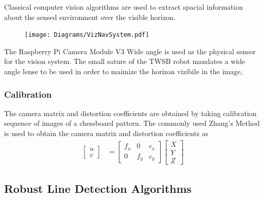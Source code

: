        Classical computer vision algorithms are used to extract spacial information about the sensed environment over the visible 
        horizon.


        

        

        \begin{figure}[H]
            \centering
            \texttt{[image: Diagrams/VizNavSystem.pdf]}
        \end{figure}

        

        The Raspberry Pi Camera Module V3 Wide angle is used as the physical sensor for the vision system.
        The small sature of the TWSB robot mandates a wide angle lense to be used in order to maimize 
        the horizon vizibile in the image, 
        \subsubsection{Calibration}
        The camera matrix and distortion coefficients are obtained by taking calibration sequence of images of a 
        chessboard pattern. The commonly used Zhang's Method is used to obtain the camera matrix and distortion coefficients as 
        \begin{equation}
            \begin{aligned}
                \begin{bmatrix}
                    u \\
                    v
                \end{bmatrix}
                &= 
                \begin{bmatrix}
                    f_x & 0 & c_x \\
                    0 & f_y & c_y
                \end{bmatrix}
                \begin{bmatrix}
                    X \\
                    Y \\
                    Z
                \end{bmatrix}
            \end{aligned}
            \label{eq:CameraModel}
        \end{equation}


        \subsection{Robust Line Detection Algorithms}

